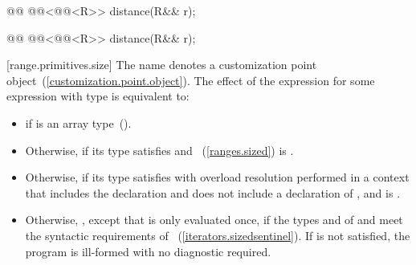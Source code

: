 {\color{newclr}
%
\begin{itemdecl}
@@
@@<@@<R>> distance(R&& r);
\end{itemdecl}

\begin{itemdescr}
\pnum \returns {}
\end{itemdescr}

%
\begin{itemdecl}
@@
@@<@@<R>> distance(R&& r);
\end{itemdecl}

\begin{itemdescr}
\pnum \returns {}
\end{itemdescr}

[range.primitives.size]{}
\pnum
The name  denotes a customization point
object~(\ref{customization.point.object}). The effect of the expression
 for some expression  with type
 is equivalent to:

\begin{itemize}
\item
   if  is an array
  type~().

\item
  Otherwise,  if its type 
  satisfies  and
  ~(\ref{ranges.sized}) is
  .

\item
  Otherwise,  if its type 
  satisfies  with overload resolution
  performed in a context that includes the declaration
   and does not include
  a declaration of , and
   is .

\item
  Otherwise,
  , except that 
  is only evaluated once, if the types  and  of
   and  meet the
  syntactic requirements of
  ~(\ref{iterators.sizedsentinel}).
  If  is not satisfied, the program is
  ill-formed with no diagnostic required.


\end{itemize}}
